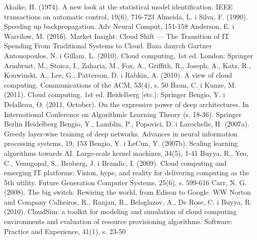 \documentclass[12pt,a4paper,twoside]{article}
\begin{document}
\begin{thebibliography}{99}
\setlength{\itemsep}{0pt}%
 Akaike, H. (1974). A new look at the statistical model identification. IEEE transactions on automatic control, 19(6), 716-723
 Almeida, L. i Silva, F. (1990). Speeding up backpropagation. Adv Neural Comput, 151-158
 Anderson, E. i Warrilow, M. (2016). Market Insight: Cloud Shift — The Transition of IT Spending From Traditional Systems to Cloud. Baza danych Gartner
 Antonopoulos, N. i Gillam, L. (2010). Cloud computing, 1st ed. London: Springer
 Armbrust, M., Stoica, I., Zaharia, M., Fox, A., Griffith, R., Joseph, A., Katz, R., Konwinski, A., Lee, G., Patterson, D. i Rabkin, A. (2010). A view of cloud computing. Communications of the ACM, 53(4), s. 50
 Baun, C. i Kunze, M. (2011). Cloud computing. 1st ed. Heidelberg [etc.]: Springer
 Bengio, Y. i Delalleau, O. (2011, October). On the expressive power of deep architectures. In International Conference on Algorithmic Learning Theory (s. 18-36). Springer Berlin Heidelberg
 Bengio, Y., Lamblin, P., Popovici, D. i Larochelle, H. (2007a). Greedy layer-wise training of deep networks. Advances in neural information processing systems, 19, 153
 Bengio, Y. i LeCun, Y. (2007b). Scaling learning algorithms towards AI. Large-scale kernel machines, 34(5), 1-41
 Buyya, R., Yeo, C., Venugopal, S., Broberg, J. i Brandic, I. (2009). Cloud computing and emerging IT platforms: Vision, hype, and reality for delivering computing as the 5th utility. Future Generation Computer Systems, 25(6), s. 599-616
 Carr, N. G. (2008). The big switch: Rewiring the world, from Edison to Google. WW Norton and Company
 Calheiros, R., Ranjan, R., Beloglazov, A., De Rose, C. i Buyya, R. (2010). CloudSim: a toolkit for modeling and simulation of cloud computing environments and evaluation of resource provisioning algorithms. Software: Practice and Experience, 41(1), s. 23-50

\end{thebibliography}
\end{document}

